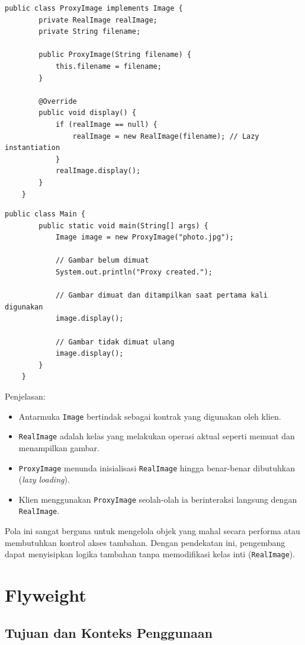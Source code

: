 \begin{lstlisting}[style=JavaStyle, caption={Proxy: ProxyImage}, label={lst:proxy-proxy}]
	public class ProxyImage implements Image {
		private RealImage realImage;
		private String filename;
		
		public ProxyImage(String filename) {
			this.filename = filename;
		}
		
		@Override
		public void display() {
			if (realImage == null) {
				realImage = new RealImage(filename); // Lazy instantiation
			}
			realImage.display();
		}
	}
\end{lstlisting}

\begin{lstlisting}[style=JavaStyle, caption={Client: Main}, label={lst:proxy-client}]
	public class Main {
		public static void main(String[] args) {
			Image image = new ProxyImage("photo.jpg");
			
			// Gambar belum dimuat
			System.out.println("Proxy created.");
			
			// Gambar dimuat dan ditampilkan saat pertama kali digunakan
			image.display();
			
			// Gambar tidak dimuat ulang
			image.display();
		}
	}
\end{lstlisting}

Penjelasan:
\begin{itemize}
	\item Antarmuka \texttt{Image} bertindak sebagai kontrak yang digunakan oleh klien.
	\item \texttt{RealImage} adalah kelas yang melakukan operasi aktual seperti memuat dan menampilkan gambar.
	\item \texttt{ProxyImage} menunda inisialisasi \texttt{RealImage} hingga benar-benar dibutuhkan (\textit{lazy loading}).
	\item Klien menggunakan \texttt{ProxyImage} seolah-olah ia berinteraksi langsung dengan \texttt{RealImage}.
\end{itemize}

Pola ini sangat berguna untuk mengelola objek yang mahal secara performa atau membutuhkan kontrol akses tambahan. Dengan pendekatan ini, pengembang dapat menyisipkan logika tambahan tanpa memodifikasi kelas inti (\texttt{RealImage}).


\section{Flyweight}

\subsection{Tujuan dan Konteks Penggunaan}

